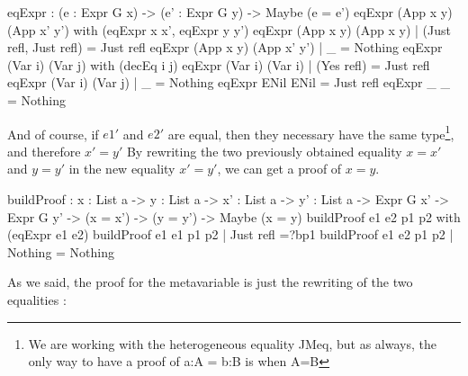 \documentclass{sigplanconf}
\begin{document}
\begin{code}[caption=Syntactical equality, captionpos=b, label=lst1:haskell2]
  eqExpr : (e : Expr G x) -> (e' : Expr G y) 
  	       -> Maybe (e = e')
  eqExpr (App x y) (App x' y') 
          with (eqExpr x x', eqExpr y y')
    eqExpr (App x y) (App x y)   
    	| (Just refl, Just refl) = Just refl
    eqExpr (App x y) (App x' y') 
    	| _ = Nothing
  eqExpr (Var i) (Var j) with (decEq i j)
    eqExpr (Var i) (Var i) 
    	| (Yes refl) = Just refl
    eqExpr (Var i) (Var j) 
    	| _ = Nothing
  eqExpr ENil ENil = Just refl
  eqExpr _ _ = Nothing
\end{code}


And of course, if $e1'$ and $e2'$ are equal, then they necessary have the same type\footnote{We are working with the heterogeneous equality JMeq, but as always, the only way to have a proof of a:A = b:B is when A=B}, and therefore $x'=y'$
By rewriting the two previously obtained equality $x=x'$ and $y=y'$ in the new equality $x'=y'$, we can get a proof of $x=y$.

\begin{code}[caption=Building the desired proof with the two proofs of equality, captionpos=b, label=lst1:haskell2]
  buildProof : {x : List a} -> {y : List a} 
               -> {x' : List a} -> {y' : List a} 
               -> Expr G x' -> Expr G y'
               -> (x = x') -> (y = y')
               -> Maybe (x = y) 
  buildProof e1 e2 p1 p2 with (eqExpr e1 e2)
    buildProof e1 e1 p1 p2  | Just refl =?bp1
    buildProof e1 e2 p1 p2 | Nothing = Nothing
\end{code}

As we said, the proof for the metavariable is just the rewriting of the two equalities :
\end{document}
